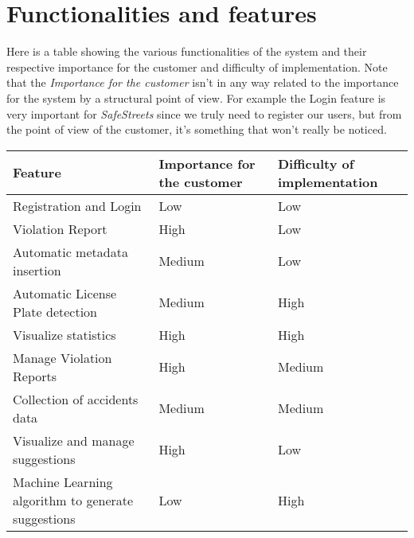 \section{Functionalities and features}
Here is a table showing the various functionalities of the system and their
respective importance for the customer and difficulty of implementation. Note
that the \emph{Importance for the customer} isn't in any way related to the
importance for the system by a structural point of view. For example the Login
feature is very important for \emph{SafeStreets} since we truly need to register
our users, but from the point of view of the customer, it's something that won't
really be noticed.

\begin{table}[ht]
    \sffamily
    \begin{tabu} to \linewidth {X[2,l,m] X[1,c,m] X[1,c,m]}
    \toprule
    \rowfont{\bfseries}
    Feature & Importance for the customer & Difficulty of implementation \\
    \midrule
    Registration and Login & Low & Low \\ \midrule
    Violation Report & High & Low \\ \midrule
    Automatic metadata insertion & Medium & Low \\ \midrule
    Automatic License Plate detection & Medium & High \\ \midrule
    Visualize statistics & High & High \\ \midrule
    Manage Violation Reports & High & Medium \\ \midrule
    Collection of accidents data & Medium & Medium \\ \midrule
    Visualize and manage suggestions & High & Low \\ \midrule
    Machine Learning algorithm to generate suggestions & Low & High \\
    \bottomrule
    \end{tabu}
\end{table}

